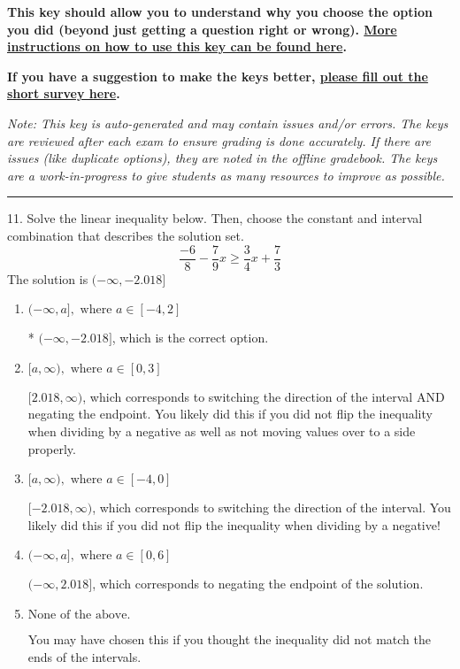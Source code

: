 \documentclass{extbook}[14pt]
\begin{document}
\textbf{This key should allow you to understand why you choose the option you did (beyond just getting a question right or wrong). \href{https://xronos.clas.ufl.edu/mac1105spring2020/courseDescriptionAndMisc/Exams/LearningFromResults}{More instructions on how to use this key can be found here}.}

\textbf{If you have a suggestion to make the keys better, \href{https://forms.gle/CZkbZmPbC9XALEE88}{please fill out the short survey here}.}

\textit{Note: This key is auto-generated and may contain issues and/or errors. The keys are reviewed after each exam to ensure grading is done accurately. If there are issues (like duplicate options), they are noted in the offline gradebook. The keys are a work-in-progress to give students as many resources to improve as possible.}

\rule{\textwidth}{0.4pt}

11. Solve the linear inequality below. Then, choose the constant and interval combination that describes the solution set.
\[ \frac{-6}{8} - \frac{7}{9} x \geq \frac{3}{4} x + \frac{7}{3} \] 
The solution is $ (-\infty, -2.018] $ 

\begin{enumerate}[label=\Alph*.] 
\item $ (-\infty, a], \text{ where } a \in [-4, 2] $ 

 * $(-\infty, -2.018]$, which is the correct option. 
\item $ [a, \infty), \text{ where } a \in [0, 3] $ 

  $[2.018, \infty)$, which corresponds to switching the direction of the interval AND negating the endpoint. You likely did this if you did not flip the inequality when dividing by a negative as well as not moving values over to a side properly. 
\item $ [a, \infty), \text{ where } a \in [-4, 0] $ 

  $[-2.018, \infty)$, which corresponds to switching the direction of the interval. You likely did this if you did not flip the inequality when dividing by a negative! 
\item $ (-\infty, a], \text{ where } a \in [0, 6] $ 

  $(-\infty, 2.018]$, which corresponds to negating the endpoint of the solution. 
\item $ \text{None of the above}. $ 

 You may have chosen this if you thought the inequality did not match the ends of the intervals. 
\end{enumerate} 
 
\end{document}
